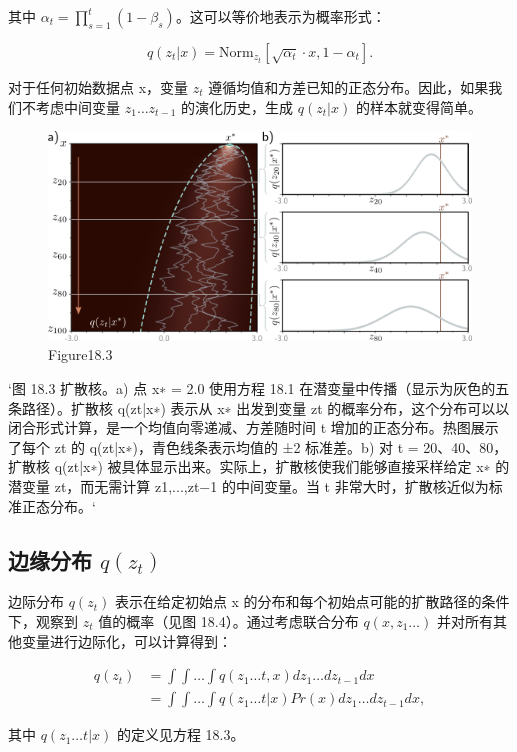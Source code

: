 其中 \(\alpha_t = \prod_{s=1}^{t} (1 - \beta_s)\)。这可以等价地表示为概率形式：

\begin{equation}
q(z_t|x) = \text{Norm}_{z_t} \left[ \sqrt{\alpha_t} \cdot x, 1 - \alpha_t \right]. 
\end{equation}

对于任何初始数据点 x，变量 \(z_t\) 遵循均值和方差已知的正态分布。因此，如果我们不考虑中间变量 \(z_1 \ldots z_{t-1}\) 的演化历史，生成 \(q(z_t|x)\) 的样本就变得简单。


\begin{figure}[ht!]
\centering
\includegraphics[width=0.7\linewidth]{png/chapter18/DiffusionKernel.png}
\caption{Figure18.3}
\end{figure}

`图 18.3 扩散核。a) 点 x∗ = 2.0 使用方程 18.1 在潜变量中传播（显示为灰色的五条路径）。扩散核 q(zt|x∗) 表示从 x∗ 出发到变量 zt 的概率分布，这个分布可以以闭合形式计算，是一个均值向零递减、方差随时间 t 增加的正态分布。热图展示了每个 zt 的 q(zt|x∗)，青色线条表示均值的 ±2 标准差。b) 对 t = 20、40、80，扩散核 q(zt|x∗) 被具体显示出来。实际上，扩散核使我们能够直接采样给定 x∗ 的潜变量 zt，而无需计算 z1,...,zt−1 的中间变量。当 t 非常大时，扩散核近似为标准正态分布。`

\subsection{边缘分布 \(q(z_t)\)}
边际分布 \(q(z_t)\) 表示在给定初始点 x 的分布和每个初始点可能的扩散路径的条件下，观察到 \(z_t\) 值的概率（见图 18.4）。通过考虑联合分布 \(q(x, z_1\ldots)\) 并对所有其他变量进行边际化，可以计算得到：


\begin{align}
q(z_t) &= \int \int \ldots \int q(z_1\ldots t, x) dz_1\ldots dz_{t-1}dx \\
&= \int \int \ldots \int q(z_1\ldots t|x) Pr(x) dz_1\ldots dz_{t-1}dx, 
\end{align} 


其中 \(q(z_1\ldots t|x)\) 的定义见方程 18.3。

